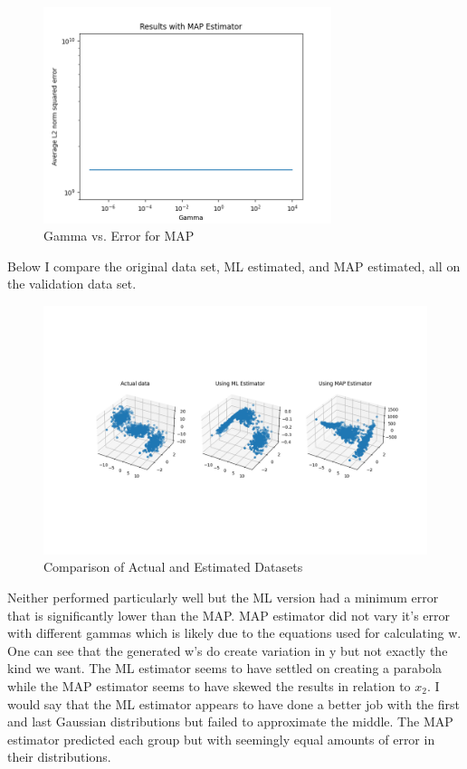 \documentclass[11pt]{article}
\begin{document}
\begin{figure}[H]
	\centering
	\includegraphics[width=0.75\textwidth]{map_gamma}
	\caption{Gamma vs. Error for MAP}
\end{figure}

Below I compare the original data set, ML estimated, and MAP estimated, all on the validation data set.

\begin{figure}[H]
	\centering
	\includegraphics[width=1.0\textwidth]{comparison}
	\caption{Comparison of Actual and Estimated Datasets}
\end{figure}

Neither performed particularly well but the ML version had a minimum error that is significantly lower than the MAP.
MAP estimator did not vary it's error with different gammas which is likely due to the equations used for calculating w.
One can see that the generated w's do create variation in y but not exactly the kind we want.
The ML estimator seems to have settled on creating a parabola while the MAP estimator seems to have skewed the results in relation to $x_2$.
I would say that the ML estimator appears to have done a better job with the first and last Gaussian distributions but failed to approximate the middle.
The MAP estimator predicted each group but with seemingly equal amounts of error in their distributions.
\end{document}

